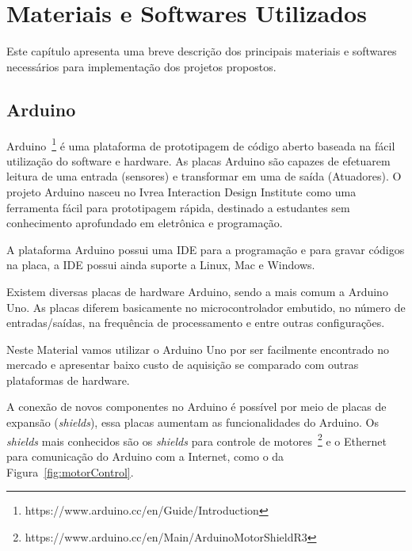 %
\chapter{Materiais e Softwares Utilizados} \label{MateSof}

Este capítulo apresenta uma breve descrição dos principais materiais e softwares necessários para implementação dos projetos propostos.  

\section{Arduino}

Arduino~\footnote{https://www.arduino.cc/en/Guide/Introduction} é uma plataforma de prototipagem de código aberto baseada na fácil utilização do software e hardware. As placas Arduino são capazes de efetuarem leitura de uma entrada (sensores) e transformar em uma de saída (Atuadores). O projeto Arduino nasceu no Ivrea Interaction Design Institute como uma ferramenta fácil para prototipagem rápida, destinado a estudantes sem conhecimento aprofundado em eletrônica e programação. 

A plataforma Arduino possui uma IDE para a programação e para gravar códigos na placa, a IDE possui ainda suporte a Linux, Mac e Windows. 

Existem diversas placas de hardware Arduino, sendo a mais comum a Arduino Uno. As placas diferem basicamente no microcontrolador embutido, no número de entradas/saídas, na frequência de processamento e entre outras configurações.

Neste Material vamos utilizar o Arduino Uno por ser facilmente encontrado no mercado e apresentar baixo custo de aquisição se comparado com outras plataformas de hardware.

A conexão de novos componentes no Arduino é possível por meio de placas de expansão (\textit{shields}), essa placas aumentam as funcionalidades do Arduino. Os \textit{shields} mais conhecidos são os \textit{shields} para controle de motores~\footnote{https://www.arduino.cc/en/Main/ArduinoMotorShieldR3} e o Ethernet para comunicação do Arduino com a Internet, como o da Figura~\ref{fig:motorControl}.  

